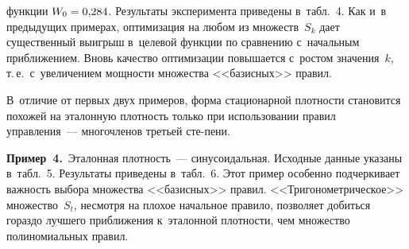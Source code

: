 \begin{multicols}{2}



\noindent
 функции $W_0\hm=0{,}284$. Результаты эксперимента 
приведены в~табл.~4. Как и~в предыду\-щих
 примерах, оптимизация на любом 
из множеств~$S_k$ дает существенный выигрыш в~целевой функции
 по 
сравнению с~начальным при\-бли\-же\-ни\-ем. Вновь качество оптимизации 
повышается с~ростом значения~$k$, т.\,е.\ с~увеличением мощ\-ности 
множества <<базисных>> правил. 

В~отличие от первых двух примеров, 
форма стационарной плот\-ности становится похожей на эталонную плотность 
только при использовании правил управ\-ле\-ния~--- многочленов третьей 
сте-\linebreak пени.



  

  \smallskip
  

  \noindent
  \textbf{Пример~4.}\ Эталонная плот\-ность~--- синусоидальная. Исходные 
данные указаны в~табл.~5. Результаты приведены в~табл.~6. 
%
Этот пример 
особенно подчеркивает важ\-ность выбора множества <<базисных>> правил. 
<<Тригонометрическое>> множество~$S_t$, несмотря на плохое начальное 
правило, позволяет добиться гораздо лучшего при\-бли\-же\-ния к~эталонной 
плот\-ности, чем множество полиномиальных правил.


   
\end{multicols}


